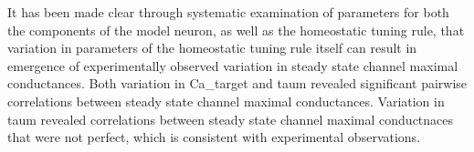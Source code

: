 It has been made clear through systematic examination of parameters for both the components of the model neuron, as well as the homeostatic tuning rule, that variation in parameters of the homeostatic tuning rule itself can result in emergence of experimentally observed variation in steady state channel maximal conductances. Both variation in \ac{Ca_target} and \ac{taum} revealed significant pairwise correlations between steady state channel maximal conductances. Variation in \ac{taum} revealed correlations between steady state channel maximal conductnaces that were not perfect, which is consistent with experimental observations\cite{santin_membrane_2019}.

